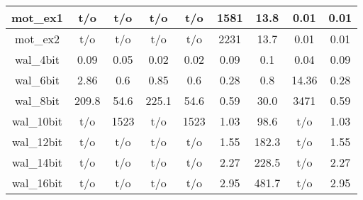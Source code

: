 \begin{table}[t]
\begin{tabular}{|c|c|c|c|c|c|c|c|c|}
mot\_ex1 & t/o       & t/o          & t/o        & t/o                  & 1581   & 13.8         & 0.01       & 0.01                 \\ \hline
mot\_ex2 & t/o       & t/o          & t/o        & t/o                  & 2231   & 13.7         & 0.01       & 0.01                 \\ \hline \hline
wal\_4bit  & 0.09      & 0.05         & 0.02       & 0.02                 & 0.09      & 0.1          & 0.04       & 0.09                 \\ \hline
wal\_6bit  & 2.86      & 0.6          & 0.85       & 0.6                  & 0.28      & 0.8          & 14.36      & 0.28                 \\ \hline
wal\_8bit  & 209.8    & 54.6         & 225.1     & 54.6                 & 0.59      & 30.0         & 3471    & 0.59                 \\ \hline
wal\_10bit & t/o       & 1523       & t/o        & 1523               & 1.03      & 98.6         & t/o        & 1.03                 \\ \hline
wal\_12bit & t/o       & t/o          & t/o        & t/o                  & 1.55      & 182.3        & t/o        & 1.55                 \\ \hline
wal\_14bit & t/o       & t/o          & t/o        & t/o                  & 2.27      & 228.5        & t/o        & 2.27                 \\ \hline
wal\_16bit & t/o       & t/o          & t/o        & t/o                  & 2.95      & 481.7        & t/o        & 2.95                 \\ \hline

\end{tabular}
\end{table} 
